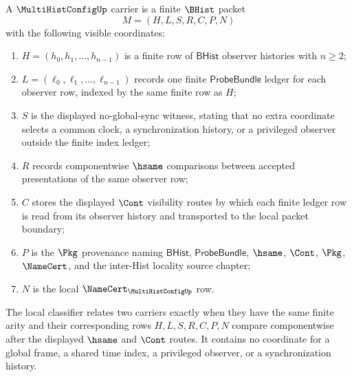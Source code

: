 \begin{definition}
\label{def:multi-hist-config-namecert-carrier}
A $\MultiHistConfigUp$ carrier is a finite $\BHist$ packet
$$
M=(H,L,S,R,C,P,N)
$$
with the following visible coordinates:
\begin{enumerate}
\item $H=(h_0,h_1,\ldots,h_{n-1})$ is a finite row of $\mathsf{BHist}$ observer histories with $n\geq 2$;
\item $L=(\ell_0,\ell_1,\ldots,\ell_{n-1})$ records one finite $\mathsf{ProbeBundle}$ ledger for each observer row, indexed by the same finite row as $H$;
\item $S$ is the displayed no-global-sync witness, stating that no extra coordinate selects a common clock, a synchronization history, or a privileged observer outside the finite index ledger;
\item $R$ records componentwise $\hsame$ comparisons between accepted presentations of the same observer row;
\item $C$ stores the displayed $\Cont$ visibility routes by which each finite ledger row is read from its observer history and transported to the local packet boundary;
\item $P$ is the $\Pkg$ provenance naming $\mathsf{BHist}$, $\mathsf{ProbeBundle}$, $\hsame$, $\Cont$, $\Pkg$, $\NameCert$, and the inter-Hist locality source chapter;
\item $N$ is the local $\NameCert_{\MultiHistConfigUp}$ row.
\end{enumerate}
The local classifier relates two carriers exactly when they have the same finite arity and their corresponding rows $H,L,S,R,C,P,N$ compare componentwise after the displayed $\hsame$ and $\Cont$ routes. It contains no coordinate for a global frame, a shared time index, a privileged observer, or a synchronization history.
\end{definition}

